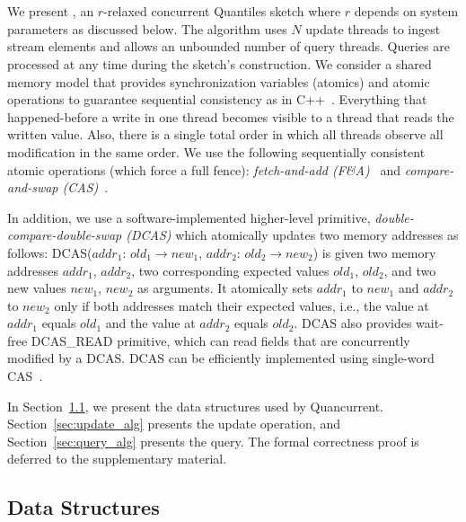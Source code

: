 \chapter{\mysketch}
\label{chap:quancurrent}

We present \mysketch, an $r$-relaxed concurrent Quantiles sketch where $r$ depends on system parameters as discussed below. The algorithm uses $N$ update threads to ingest stream elements and allows an unbounded number of query threads. Queries are processed at any time during the sketch's construction. 
We consider a shared memory model that provides synchronization variables (atomics) and atomic operations to guarantee sequential consistency as in C++~\cite{Boehm_2008_cpp}. Everything that happened-before a write in one thread becomes visible to a thread that reads the written value. Also, there is a single total order in which all threads observe all modification in the same order. 
We use the following sequentially consistent atomic operations (which force a full fence): \emph{fetch-and-add (F\&A)}~\cite{x86-faa} and \emph{compare-and-swap (CAS)}~\cite{x86-cas}. 

In addition, we use a software-implemented higher-level primitive, \emph{double-compare-double-swap (DCAS)} which atomically updates two memory addresses as follows: DCAS($addr_1$: $old_1 \to new_1$, $addr_2$: $old_2 \to new_2$)
is given two memory addresses $addr_1$, $addr_2$, two corresponding expected values $old_1$, $old_2$, and two new values $new_1$, $new_2$ as arguments. It atomically sets $addr_1$ to $new_1$ and $addr_2$ to $new_2$ only if both addresses match their expected values, i.e., the value at $addr_1$ equals $old_1$ and the value at $addr_2$ equals $old_2$. DCAS also provides wait-free DCAS\_READ primitive, which can read fields that are concurrently modified by a DCAS. DCAS can be efficiently implemented using single-word CAS~\cite{Harris2002practical,guerraoui2020efficient}. 


In Section~\ref{sec:data_org}, we present the data structures used by Quancurrent. Section~\ref{sec:update_alg} presents the update operation, and  Section~\ref{sec:query_alg} presents the query. The formal correctness proof is deferred to the supplementary material. 


\section{Data Structures} \label{sec:data_org}

